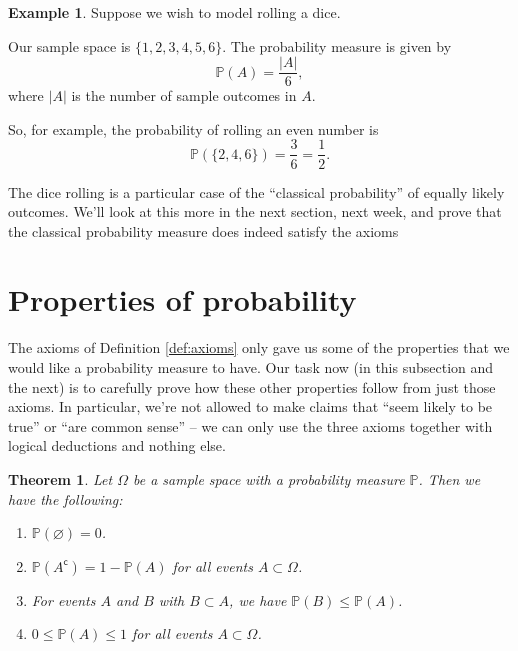 \documentclass[
  a4paper,
]{book}
\providecommand{\tightlist}{%
  \setlength{\itemsep}{0pt}\setlength{\parskip}{0pt}}
\newtheorem{theorem}{Theorem}[chapter]
\theoremstyle{definition}
\theoremstyle{definition}
\newtheorem{example}{Example}[chapter]
\theoremstyle{definition}
\theoremstyle{definition}
\theoremstyle{remark}
\begin{document}
\begin{example}
Suppose we wish to model rolling a dice.

Our sample space is \(\{1,2,3,4,5,6\}\). The probability measure is given by
\[ \mathbb P(A) = \frac{|A|}{6} , \]
where \(|A|\) is the number of sample outcomes in \(A\).

So, for example, the probability of rolling an even number is
\[ \mathbb P(\{2,4,6\}) = \frac36 = \frac12 . \]
\end{example}

The dice rolling is a particular case of the ``classical probability'' of equally likely outcomes. We'll look at this more in the next section, next week, and prove that the classical probability measure does indeed satisfy the axioms

\hypertarget{prob-properties}{%
\section{Properties of probability}\label{prob-properties}}

The axioms of Definition \ref{def:axioms} only gave us some of the properties that we would like a probability measure to have. Our task now (in this subsection and the next) is to carefully prove how these other properties follow from just those axioms. In particular, we're not allowed to make claims that ``seem likely to be true'' or ``are common sense'' -- we can only use the three axioms together with logical deductions and nothing else.

\begin{theorem}

Let \(\Omega\) be a sample space with a probability measure \(\mathbb P\). Then we have the following:

\begin{enumerate}
\def\labelenumi{\arabic{enumi}.}
\tightlist
\item
  \(\mathbb P(\varnothing) = 0\).
\item
  \(\mathbb P(A^\mathsf{c}) = 1 - \mathbb P(A)\) for all events \(A \subset \Omega\).
\item
  For events \(A\) and \(B\) with \(B \subset A\), we have \(\mathbb P(B) \leq \mathbb P(A)\).
\item
  \(0 \leq \mathbb P(A) \leq 1\) for all events \(A \subset \Omega\).
\end{enumerate}

\end{theorem}
\end{document}
